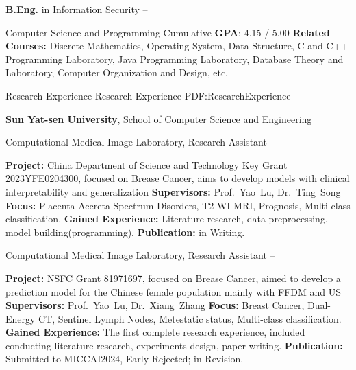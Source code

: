 \documentclass[a4paper,MMMyyyy,nonstopmode]{simpleresumecv}
\begin{document}
\begin{Body}
\Gap
\BulletItem
\textbf{B.Eng.} in
\href{https://xxxy.lzu.edu.cn/}
{Information Security}
\hfill
{} --
\begin{Detail}
    \SubBulletItem
    Computer Science and Programming
    \SubBulletItem
    Cumulative \textbf{GPA}: 4.15 / 5.00
    \SubBulletItem
    \textbf{Related Courses:}
    Discrete Mathematics, Operating System, Data Structure, C and C++ Programming Laboratory, 
    Java Programming Laboratory, Database Theory and Laboratory, Computer Organization and Design, etc.
\end{Detail}


\Section
{{\large Research Experience}}
{{\large Research Experience}}
{PDF:ResearchExperience}

\Entry
\href{https://www.imageanalysis.cn/}
{\textbf{Sun Yat-sen University}},
School of Computer Science and Engineering

\Gap
\BulletItem
Computational Medical Image Laboratory, Research Assistant
\hfill
{} --
\begin{Detail}
\SubBulletItem
\textbf{Project:}
China Department of Science and Technology Key Grant 2023YFE0204300, focused on Brease Cancer, 
aims to develop models with clinical interpretability and generalization
\SubBulletItem
\textbf{Supervisors:}
Prof.~Yao~Lu, 
Dr.~Ting~Song
\SubBulletItem
\textbf{Focus:}
Placenta Accreta Spectrum Disorders, T2-WI MRI, Prognosis, Multi-class classification.
\SubBulletItem
\textbf{Gained Experience:}
Literature research, data preprocessing, model building(programming).
\SubBulletItem
\textbf{Publication:}
in Writing.
\end{Detail}

\BigGap
\BulletItem
Computational Medical Image Laboratory, Research Assistant
\hfill
{} --
\begin{Detail}
\SubBulletItem
\textbf{Project:}
NSFC Grant 81971697, focused on Brease Cancer, 
aimed to develop a prediction model for the Chinese female population mainly with FFDM and US
\SubBulletItem
\textbf{Supervisors:}
Prof.~Yao~Lu, 
Dr.~Xiang~Zhang
\SubBulletItem
\textbf{Focus:}
Breast Cancer, Dual-Energy CT, Sentinel Lymph Nodes, Metestatic status, Multi-class classification.
\SubBulletItem
\textbf{Gained Experience:}
The first complete research experience, included conducting literature research, experiments design, paper writing.
\SubBulletItem
\textbf{Publication:}
Submitted to MICCAI2024, Early Rejected; in Revision.
\end{Detail}


\end{Body}
\end{document}
